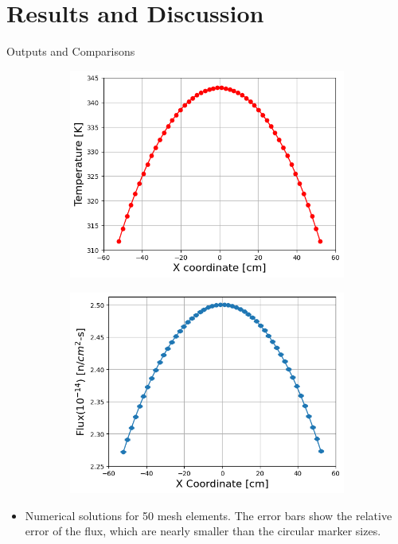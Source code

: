 \documentclass[9pt,t]{beamer}
\begin{document}
\section{Results and Discussion}
\begin{frame}{Outputs and Comparisons}
    \begin{figure}[T]
        \centering
        \begin{subfigure}[b]{0.475\linewidth}
            \centering
            \includegraphics[height=0.8\linewidth]{figures/temp_50.png}
        \end{subfigure}\hspace{0.25cm}
        \begin{subfigure}[b]{0.475\linewidth}
        \centering
            \includegraphics[height=0.8\linewidth]{figures/flux_50.png}
        \end{subfigure}
    \end{figure}
    \begin{itemize}
        \item Numerical solutions for 50 mesh elements. The error bars show the relative error of the flux, which are
        nearly smaller than the circular marker sizes.
    \end{itemize}
\end{frame}
\end{document}
